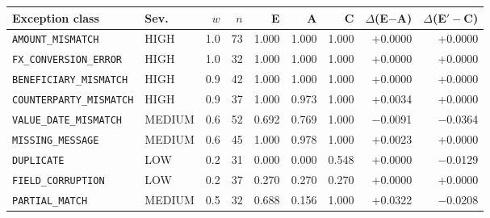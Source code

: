 \begin{tabular}{@{}llrrrrrrr@{}}
\toprule
Exception class & Sev. & $w$ & $n$ & E & A & C & $\Delta$(E$-$A) & $\Delta$(E$'-$C) \\
\midrule
\texttt{AMOUNT\_MISMATCH} & HIGH & 1.0 & 73 & 1.000 & 1.000 & 1.000 & +0.0000 & +0.0000 \\
\texttt{FX\_CONVERSION\_ERROR} & HIGH & 1.0 & 32 & 1.000 & 1.000 & 1.000 & +0.0000 & +0.0000 \\
\texttt{BENEFICIARY\_MISMATCH} & HIGH & 0.9 & 42 & 1.000 & 1.000 & 1.000 & +0.0000 & +0.0000 \\
\texttt{COUNTERPARTY\_MISMATCH} & HIGH & 0.9 & 37 & 1.000 & 0.973 & 1.000 & +0.0034 & +0.0000 \\
\texttt{VALUE\_DATE\_MISMATCH} & MEDIUM & 0.6 & 52 & 0.692 & 0.769 & 1.000 & $-$0.0091 & $-$0.0364 \\
\texttt{MISSING\_MESSAGE} & MEDIUM & 0.6 & 45 & 1.000 & 0.978 & 1.000 & +0.0023 & +0.0000 \\
\texttt{DUPLICATE} & LOW & 0.2 & 31 & 0.000 & 0.000 & 0.548 & +0.0000 & $-$0.0129 \\
\texttt{FIELD\_CORRUPTION} & LOW & 0.2 & 37 & 0.270 & 0.270 & 0.270 & +0.0000 & +0.0000 \\
\texttt{PARTIAL\_MATCH} & MEDIUM & 0.5 & 32 & 0.688 & 0.156 & 1.000 & +0.0322 & $-$0.0208 \\
\bottomrule
\end{tabular}
